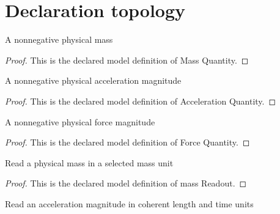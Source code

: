 \section{Declaration topology}
\begin{definition}
  \label{def:physics:phyx-mini-0761:phyxminiproblems-problemphyxmini0761-massquantity}
  A nonnegative physical mass
\end{definition}
\begin{proof}
  This is the declared model definition of Mass Quantity.
\end{proof}
\begin{definition}
  \label{def:physics:phyx-mini-0761:phyxminiproblems-problemphyxmini0761-accelerationquantity}
  A nonnegative physical acceleration magnitude
\end{definition}
\begin{proof}
  This is the declared model definition of Acceleration Quantity.
\end{proof}
\begin{definition}
  \label{def:physics:phyx-mini-0761:phyxminiproblems-problemphyxmini0761-forcequantity}
  A nonnegative physical force magnitude
\end{definition}
\begin{proof}
  This is the declared model definition of Force Quantity.
\end{proof}
\begin{definition}
  \label{def:physics:phyx-mini-0761:phyxminiproblems-problemphyxmini0761-massreadout}
  Read a physical mass in a selected mass unit
\end{definition}
\begin{proof}
  This is the declared model definition of mass Readout.
\end{proof}
\begin{definition}
  \label{def:physics:phyx-mini-0761:phyxminiproblems-problemphyxmini0761-accelerationreadout}
  Read an acceleration magnitude in coherent length and time units
\end{definition}
